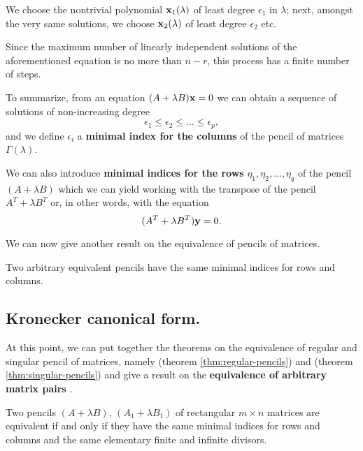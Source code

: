 We choose the nontrivial polynomial \(\vb{x}_{1}(\lambda)\) of least degree \(\epsilon_{1}\) in \(\lambda\); next,
amongst the very same solutions, we choose \(\vb{x}_{2}(\lambda)\) of least degree \(\epsilon_{2}\) etc.

Since the maximum number of linearly independent solutions of the aforementioned equation
is no more than \(n - r\), this process has a finite number of steps.

To summarize, from an equation \((A + \lambda B)\vb{x} = 0\) we can obtain a sequence of solutions of non-increasing degree
\[
    \epsilon_{1} \leq \epsilon_{2} \leq ... \leq \epsilon_{p},
\]
and we define \(\epsilon_{i}\) a \textbf{minimal index for the columns} \cite[p. 38]{gantmacher} of the pencil of matrices
\(\Gamma(\lambda)\).

We can also introduce \textbf{minimal indices for the rows} \cite[p. 38]{gantmacher} \(\eta_{1}, \eta_{2}, ..., \eta_{q}\)
of the pencil \((A + \lambda B)\) which we can yield working with the transpose of the pencil \(A^T + \lambda B^T\)
or, in other words, with the equation
\[
    (A^T + \lambda B^T)\vb{y} = 0.
\]

We can now give another result on the equivalence of pencils of matrices.

\begin{theorem} \cite[p. 39]{gantmacher} \label{thm:singular-pencils}
    Two arbitrary equivalent pencils have the same minimal indices for rows and columns.
\end{theorem}

\subsection*{Kronecker canonical form.}
At this point, we can put together the theorems on the equivalence of regular and singular pencil of matrices, namely
 (theorem \ref{thm:regular-pencils}) and
 (theorem \ref{thm:singular-pencils}) and give a result on the \textbf{equivalence of
arbitrary matrix pairs} \cite{kronecker1890}.
\begin{theorem}[Kronecker] \cite[p. 40, Theorem 5]{gantmacher} \label{thm:kronecker}
    Two pencils \((A + \lambda B)\), \((A_{1} + \lambda B_{1})\) of rectangular \(m \times n\) matrices
    are equivalent if and only if they have the same minimal indices for rows and columns and the same elementary finite and
    infinite divisors.
\end{theorem}

